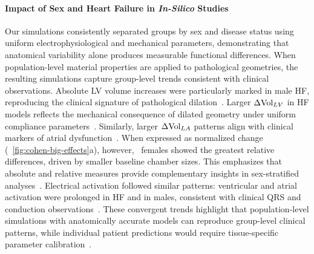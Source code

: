 \paragraph{Impact of Sex and Heart Failure in \emph{In-Silico} Studies}
Our simulations consistently separated groups by sex and disease status using 
uniform electrophysiological and mechanical parameters, demonstrating that 
anatomical variability alone produces measurable functional differences. 
When population-level material properties are applied to pathological geometries, 
the resulting simulations capture group-level trends consistent with clinical observations. 
Absolute LV volume increases were particularly marked in male HF, reproducing the 
clinical signature of pathological dilation~\cite{kasa-2024-lv_volume,ito-2021-lv_volume}. 
Larger $\Delta \mathrm{Vol}_{LV}$ in HF models reflects the mechanical consequence of dilated 
geometry under uniform compliance parameters~\cite{zile-2004-stiffness,aurigemma-2006-stiffness}. 
Similarly, larger $\Delta \mathrm{Vol}_{LA}$ patterns align with clinical markers of atrial 
dysfunction~\cite{Carpenito-2021-la-stiffness,kim-2023-la-stiffness}. 
When expressed as normalized change      
(~\ref{fig:cohen-big-effects}a), 
however, \HF\ females showed the greatest relative differences, 
driven by smaller baseline chamber sizes. 
This emphasizes that absolute and relative measures provide complementary insights in 
sex-stratified analyses~\cite{steuernagel2023_sex_bias}. 
Electrical activation followed similar patterns: ventricular and atrial activation were 
prolonged in HF and in males, consistent with clinical QRS and conduction 
observations~\cite{sanders-2003-atrialremodelling,buck-2008-crt}. 
These convergent trends highlight that population-level simulations with anatomically 
accurate models can reproduce group-level clinical patterns, while individual patient 
predictions would require tissue-specific parameter calibration~\cite{strocchi2020_cohort}.



